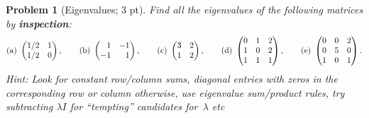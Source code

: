 \documentclass[12pt,a4]{article}
\newtheorem{problem}{Problem}
\begin{document}
\begin{problem}[Eigenvalues; 3 pt]\rm Find all the eigenvalues of the following matrices by \textbf{inspection}:
	\begin{gather*}
	\mathrm{(a)} \ \begin{pmatrix}
	1/2 & 1 \\ 1/2 & 0
	\end{pmatrix}, \qquad
	\mathrm{(b)} \ \begin{pmatrix}
	\hphantom{-}1 & -1 \\ -1 & \hphantom{-}1
	\end{pmatrix}, \qquad
	\mathrm{(c)} \ \begin{pmatrix}
	3 & 2 \\ 1 & 2
	\end{pmatrix}, \qquad
	\mathrm{(d)} \ \begin{pmatrix}
	0 & 1 & 2 \\
	1 & 0 & 2 \\
	1 & 1 & 1
	\end{pmatrix},
	\qquad
	\mathrm{(e)} \ \begin{pmatrix}
	0 & 0 & 2 \\
	0 & 5 & 0 \\
	1 & 0 & 1
	\end{pmatrix}.
	\end{gather*}
	{\small \textsf{Hint:
			Look for constant row/column sums, diagonal entries with zeros in the corresponding row or column otherwise, use eigenvalue sum/product rules, try subtracting $\lambda I$ for ``tempting'' candidates for~$\lambda$ etc}}
\end{problem}
\end{document}
